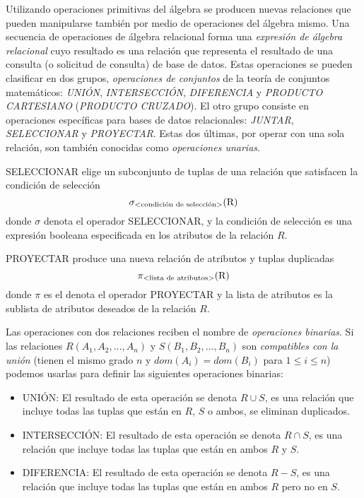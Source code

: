 Utilizando operaciones primitivas del álgebra se producen nuevas relaciones que pueden manipularse también por medio de operaciones del álgebra mismo. Una secuencia de operaciones de álgebra relacional forma una \emph{expresión de álgebra relacional} cuyo resultado es una relación que representa el resultado de una consulta (o solicitud de consulta) de base de datos.\cite{elma11} Estas operaciones se pueden clasificar en dos grupos, \emph{operaciones de conjuntos} de la teoría de conjuntos matemáticos: \emph{UNIÓN}, \emph{INTERSECCIÓN}, \emph{DIFERENCIA} y \emph{PRODUCTO CARTESIANO} (\emph{PRODUCTO CRUZADO}). El otro grupo consiste en operaciones específicas para bases de datos relacionales: \emph{JUNTAR}, \emph{SELECCIONAR} y \emph{PROYECTAR}. Estas dos últimas, por operar con una sola relación, son también conocidas como \emph{operaciones unarias}.

SELECCIONAR elige un subconjunto de tuplas de una relación que satisfacen la condición de selección
\begin{equation}
\sigma_\text{\textless condición de selección\textgreater}{\text{(R)}}
\end{equation}
donde $\sigma$ denota el operador SELECCIONAR, y la condición de selección es una expresión booleana especificada en los atributos de la relación $R$.

PROYECTAR produce una nueva relación de atributos y tuplas duplicadas
\begin{equation}
\pi_\text{\textless lista de atributos\textgreater}{\text{(R)}}
\end{equation}
donde $\pi$ es el denota el operador PROYECTAR y la lista de atributos es la sublista de atributos deseados de la relación $R$.

Las operaciones con dos relaciones reciben el nombre de \emph{operaciones binarias}. Si las relaciones $R(A_1,A_2,\ldots,A_n)$ y $S(B_1,B_2,\ldots,B_n)$ son \emph{compatibles con la unión} (tienen el mismo grado $n$ y $dom(A_i)=dom(B_i)$ para $1\leq i\leq n$) podemos usarlas para definir las siguientes operaciones binarias:
\begin{itemize}
	\item UNIÓN: El resultado de esta operación se denota $R \cup S$, es una relación que incluye todas las tuplas que están en $R$, $S$ o ambos, se eliminan duplicados.
	\item INTERSECCIÓN: El resultado de esta operación se denota $R \cap S$, es una relación que incluye todas las tuplas que están en ambos $R$ y $S$.
	\item DIFERENCIA: El resultado de esta operación se denota $R - S$, es una relación que incluye todas las tuplas que están en ambos $R$ pero no en $S$.
\end{itemize}

